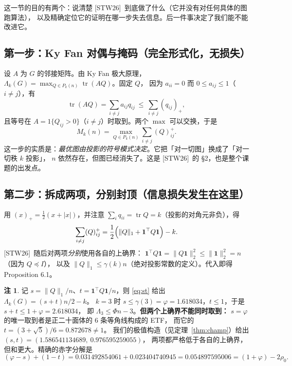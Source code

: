 \documentclass[UTF8,11pt]{ctexart}
\theoremstyle{definition}
\newtheorem{remark}[theorem]{注}
\newcommand{\Lam}{\Lambda}
\newcommand{\tr}{\operatorname{tr}}
\newcommand{\one}{\mathbf{1}}
\newcommand{\STW}{\textup{[STW26]}}
\begin{document}
这一节的目的有两个：说清楚 \STW\ 到底做了什么（它并没有对任何具体的图跑算法），
以及精确定位它的证明在哪一步失去信息。后一件事决定了我们能不能改进它。

\subsection{第一步：Ky Fan 对偶与掩码（完全形式化，无损失）}

设 $A$ 为 $G$ 的邻接矩阵。由 Ky Fan 极大原理，
$\Lam_k(G)=\max_{Q\in P_k(n)}\tr(AQ)$。固定 $Q$，
因为 $a_{ii}=0$ 而 $0\le a_{ij}\le1$（$i\ne j$），有
\[
\tr(AQ)=\sum_{i\ne j}a_{ij}q_{ij}\ \le\ \sum_{i\ne j}(q_{ij})_+ ,
\]
且等号在 $A=1\{Q_{ij}>0\}$（$i\ne j$）时取到。两个 $\max$ 可以交换，于是
\begin{equation}\label{eq:mask}
M_k(n)=\max_{Q\in P_k(n)}\sum_{i\ne j}(Q)_{ij}^{+}.
\end{equation}
这一步的实质是：\emph{最优图由投影的符号模式决定}。它把「对一切图」换成了「对一切秩 $k$ 投影」，
$n$ 依然存在，但图已经消失了。这是 \STW\ 的 \S2，也是整个课题的出发点。

\subsection{第二步：拆成两项，分别封顶（信息损失发生在这里）}

用 $(x)_+=\frac12(x+|x|)$，并注意 $\sum_i q_{ii}=\tr Q=k$（投影的对角元非负），得
\begin{equation}\label{eq:st}
\sum_{i\ne j}(Q)_{ij}^{+}=\frac12\Bigl(\|Q\|_1+\one^\top Q\one\Bigr)-k .
\end{equation}
\STW\ 随后对两项\emph{分别}使用各自的上确界：
$\one^\top Q\one=\|Q\one\|_2^2\le\|\one\|_2^2=n$（因为 $Q\preceq I$），
以及 $\|Q\|_1\le\gamma(k)n$（绝对投影常数的定义）。代入即得 Proposition 6.1。

\begin{remark}\label{rmk:loss}
记 $s=\|Q\|_1/n$、$t=\one^\top Q\one/n$，则 \eqref{eq:st} 给出 $\Lam_k(G)=(s+t)n/2-k$。
$k=3$ 时 $s\le\gamma(3)=\varphi=1.618034$，$t\le1$，于是 $s+t\le 1+\varphi=2.618034$，
即 $\Lam_3\le\Phi n-3$。\textbf{但两个上确界不能同时取到：}
$s=\varphi$ 的唯一取到者是正二十面体的 $6$ 条等角线构成的 ETF，
而它的 $t=(3+\sqrt5)/6=0.872678\ne1$。
我们的极值构造（见定理~\ref{thm:champ}）给出 $(s,t)=(1.586541134689,\ 0.976595259055)$，
两项都严格低于各自的上确界，但和更大。精确的赤字分解是
\[
(\varphi-s)+(1-t)=0.031492854061+0.023404740945=0.054897595006=(1+\varphi)-2\rho_0 .
\]
\end{remark}
\end{document}

